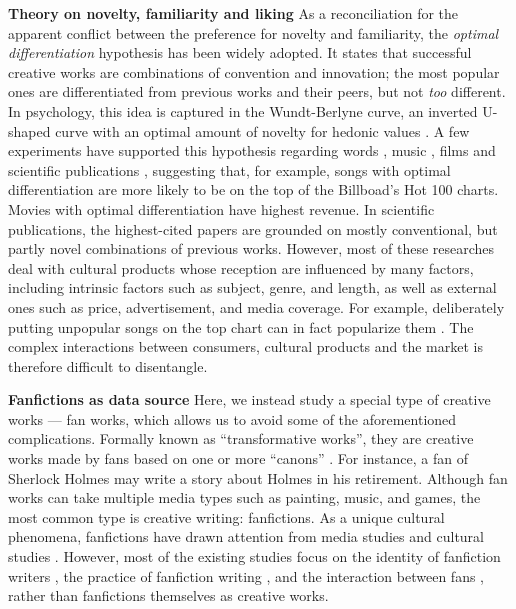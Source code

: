 \documentclass[letterpaper]{article} %
\begin{document}
\textbf{Theory on novelty, familiarity and liking}    As a reconciliation for the apparent conflict between the preference for novelty and familiarity, the \emph{optimal differentiation} hypothesis has been widely adopted. It states that successful creative works are combinations of convention and innovation; the most popular ones are differentiated from previous works and their peers, but not \emph{too} different. In psychology, this idea is captured in the Wundt-Berlyne curve, an inverted U-shaped curve with an optimal amount of novelty for hedonic values \cite{berlyne1970novelty}. A few experiments have supported this hypothesis regarding words \cite{sluckin1980liking}, music \cite{hargreaves1984effects}  \cite{askin2017makes},  films \cite{sreenivasan2013quantitative} and scientific publications \cite{uzzi2013atypical}, suggesting that, for example, songs with optimal differentiation are more likely to be on the top of the Billboad's Hot 100 charts. Movies with optimal differentiation have highest revenue. In scientific publications, the highest-cited papers are grounded on mostly conventional, but partly novel combinations of previous works. However, most of these researches deal with cultural products whose reception are influenced by many factors, including intrinsic factors such as subject, genre, and length, as well as external ones such as price, advertisement, and media coverage. For example, deliberately putting unpopular songs on the top chart can in fact popularize them \cite{salganik2008leading}. The complex interactions between consumers, cultural products and the market is therefore difficult to disentangle. 
 
\textbf{Fanfictions as data source}   Here, we instead study a special type of creative works --- fan works, which allows us to avoid 
some of the aforementioned complications. Formally known as ``transformative works'', they are creative works made by fans based on one or more ``canons'' \cite{wiki:transf_work}. For instance, a fan of Sherlock Holmes may write a story about Holmes in his retirement. Although fan works can take multiple media types such as painting, music, and games, the most common type is creative writing: fanfictions. As a unique cultural phenomena, fanfictions have drawn attention from media studies and cultural studies \cite{thomas2011fanfiction}. However, most of the existing studies focus on the identity of fanfiction writers \cite{black2006language}, the practice of fanfiction writing \cite{LIT:LIT12061}, and the interaction between fans \cite{hills2015expertise}, rather than fanfictions themselves as creative works.
\end{document}
